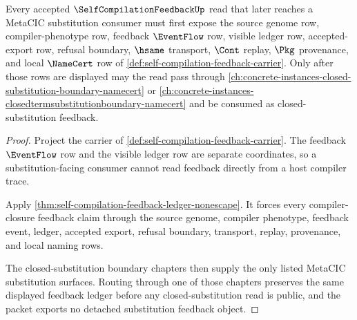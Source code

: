 \begin{theorem}
\label{thm:self-compilation-feedback-closed-substitution-route}
Every accepted $\SelfCompilationFeedbackUp$ read that later reaches a MetaCIC substitution consumer must first expose the source genome row, compiler-phenotype row, feedback $\EventFlow$ row, visible ledger row, accepted-export row, refusal boundary, $\hsame$ transport, $\Cont$ replay, $\Pkg$ provenance, and local $\NameCert$ row of \autoref{def:self-compilation-feedback-carrier}. Only after those rows are displayed may the read pass through \autoref{ch:concrete-instances-closed-substitution-boundary-namecert} or \autoref{ch:concrete-instances-closedtermsubstitutionboundary-namecert} and be consumed as closed-substitution feedback.
\end{theorem}
\begin{proof}
Project the carrier of \autoref{def:self-compilation-feedback-carrier}. The feedback $\EventFlow$ row and the visible ledger row are separate coordinates, so a substitution-facing consumer cannot read feedback directly from a host compiler trace.

Apply \autoref{thm:self-compilation-feedback-ledger-nonescape}. It forces every compiler-closure feedback claim through the source genome, compiler phenotype, feedback event, ledger, accepted export, refusal boundary, transport, replay, provenance, and local naming rows.

The closed-substitution boundary chapters then supply the only listed MetaCIC substitution surfaces. Routing through one of those chapters preserves the same displayed feedback ledger before any closed-substitution read is public, and the packet exports no detached substitution feedback object.
\end{proof}



